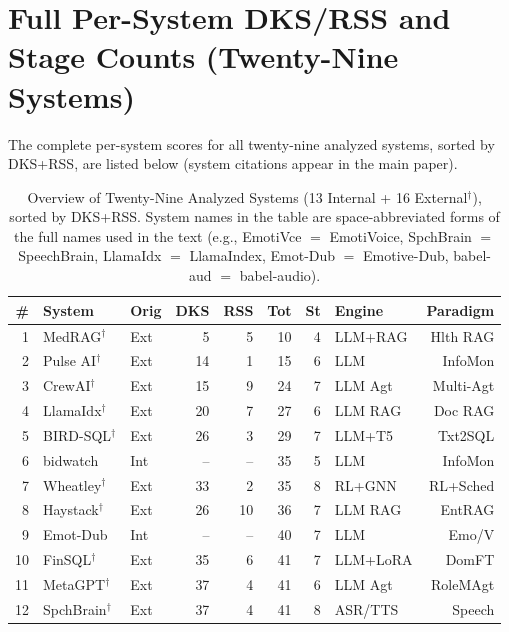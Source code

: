 \documentclass[10pt,a4paper]{article}
\begin{document}
\section{Full Per-System DKS/RSS and Stage Counts (Twenty-Nine Systems)}

The complete per-system scores for all twenty-nine analyzed systems, sorted by DKS+RSS, are listed below (system citations appear in the main paper).

\begin{table}[t]
\centering
\caption{Overview of Twenty-Nine Analyzed Systems (13 Internal + 16 External$^\dagger$), sorted by DKS+RSS. System names in the table are space-abbreviated forms of the full names used in the text (e.g., EmotiVce $=$ EmotiVoice, SpchBrain $=$ SpeechBrain, LlamaIdx $=$ LlamaIndex, Emot-Dub $=$ Emotive-Dub, babel-aud $=$ babel-audio).}
\label{tab:all_systems}
\small
\setlength{\tabcolsep}{4pt}
\begin{tabular*}{\textwidth}{@{\extracolsep{\fill}}rllrrrrlr@{}}
\toprule
\textbf{\#} & \textbf{System} & \textbf{Orig} & \textbf{DKS} & \textbf{RSS} & \textbf{Tot} & \textbf{St} & \textbf{Engine} & \textbf{Paradigm} \\
\midrule
1  & MedRAG$^\dagger$     & Ext & 5  & 5  & 10 &  4 & LLM+RAG   & Hlth RAG  \\
2  & Pulse AI$^\dagger$  & Ext & 14 & 1  & 15 &  6 & LLM       & InfoMon   \\
3  & CrewAI$^\dagger$    & Ext & 15 & 9  & 24 &  7 & LLM Agt   & Multi-Agt \\
4  & LlamaIdx$^\dagger$ & Ext & 20 & 7  & 27 &  6 & LLM RAG   & Doc RAG   \\
5  & BIRD-SQL$^\dagger$  & Ext & 26 & 3  & 29 &  7 & LLM+T5    & Txt2SQL   \\
6  & bidwatch            & Int & -- & -- & 35 &  5 & LLM       & InfoMon   \\
7  & Wheatley$^\dagger$ & Ext & 33 & 2  & 35 &  8 & RL+GNN    & RL+Sched  \\
8  & Haystack$^\dagger$ & Ext & 26 & 10 & 36 &  7 & LLM RAG   & EntRAG    \\
9  & Emot-Dub            & Int & -- & -- & 40 &  7 & LLM       & Emo/V     \\
10 & FinSQL$^\dagger$    & Ext & 35 & 6  & 41 &  7 & LLM+LoRA  & DomFT     \\
11 & MetaGPT$^\dagger$   & Ext & 37 & 4  & 41 &  6 & LLM Agt   & RoleMAgt  \\
12 & SpchBrain$^\dagger$ & Ext & 37 & 4  & 41 &  8 & ASR/TTS   & Speech    \\

\end{tabular*}
\end{table}
\end{document}
